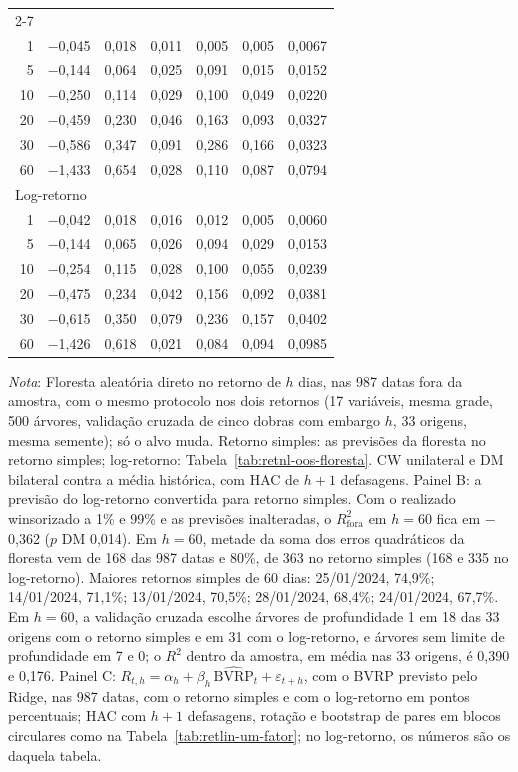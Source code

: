 \begin{table}[H]
\begin{tabular}{rrrrrrr}
\cmidrule(lr){2-7}
\multicolumn{7}{l}{Retorno simples} \\
1 & $-$0{,}045 & 0{,}018 & 0{,}011 & 0{,}005 & 0{,}005 & 0{,}0067 \\
5 & $-$0{,}144 & 0{,}064 & 0{,}025 & 0{,}091 & 0{,}015 & 0{,}0152 \\
10 & $-$0{,}250 & 0{,}114 & 0{,}029 & 0{,}100 & 0{,}049 & 0{,}0220 \\
20 & $-$0{,}459 & 0{,}230 & 0{,}046 & 0{,}163 & 0{,}093 & 0{,}0327 \\
30 & $-$0{,}586 & 0{,}347 & 0{,}091 & 0{,}286 & 0{,}166 & 0{,}0323 \\
60 & $-$1{,}433 & 0{,}654 & 0{,}028 & 0{,}110 & 0{,}087 & 0{,}0794 \\
\multicolumn{7}{l}{Log-retorno} \\
1 & $-$0{,}042 & 0{,}018 & 0{,}016 & 0{,}012 & 0{,}005 & 0{,}0060 \\
5 & $-$0{,}144 & 0{,}065 & 0{,}026 & 0{,}094 & 0{,}029 & 0{,}0153 \\
10 & $-$0{,}254 & 0{,}115 & 0{,}028 & 0{,}100 & 0{,}055 & 0{,}0239 \\
20 & $-$0{,}475 & 0{,}234 & 0{,}042 & 0{,}156 & 0{,}092 & 0{,}0381 \\
30 & $-$0{,}615 & 0{,}350 & 0{,}079 & 0{,}236 & 0{,}157 & 0{,}0402 \\
60 & $-$1{,}426 & 0{,}618 & 0{,}021 & 0{,}084 & 0{,}094 & 0{,}0985 \\
\bottomrule
\end{tabular}
\par\smallskip
\parbox{0.95\linewidth}{\footnotesize\textit{Nota}: Floresta aleatória direto no retorno de $h$ dias, nas 987 datas fora da amostra, com o mesmo protocolo nos dois retornos (17 variáveis, mesma grade, 500 árvores, validação cruzada de cinco dobras com embargo $h$, 33 origens, mesma semente); só o alvo muda. Retorno simples: as previsões da floresta no retorno simples; log-retorno: Tabela~\ref{tab:retnl-oos-floresta}. CW unilateral e DM bilateral contra a média histórica, com HAC de $h+1$ defasagens. Painel B: a previsão do log-retorno convertida para retorno simples. Com o realizado winsorizado a 1\% e 99\% e as previsões inalteradas, o $R^2_{\text{fora}}$ em $h = 60$ fica em $-$0{,}362 ($p$ DM 0{,}014). Em $h = 60$, metade da soma dos erros quadráticos da floresta vem de 168 das 987 datas e 80\%, de 363 no retorno simples (168 e 335 no log-retorno). Maiores retornos simples de 60 dias: 25/01/2024, 74{,}9\%; 14/01/2024, 71{,}1\%; 13/01/2024, 70{,}5\%; 28/01/2024, 68{,}4\%; 24/01/2024, 67{,}7\%. Em $h = 60$, a validação cruzada escolhe árvores de profundidade 1 em 18 das 33 origens com o retorno simples e em 31 com o log-retorno, e árvores sem limite de profundidade em 7 e 0; o $R^2$ dentro da amostra, em média nas 33 origens, é 0{,}390 e 0{,}176. Painel C: $R_{t,h} = \alpha_h + \beta_h\,\widehat{\text{BVRP}}_t + \varepsilon_{t+h}$, com o BVRP previsto pelo Ridge, nas 987 datas, com o retorno simples e com o log-retorno em pontos percentuais; HAC com $h+1$ defasagens, rotação e bootstrap de pares em blocos circulares como na Tabela~\ref{tab:retlin-um-fator}; no log-retorno, os números são os daquela tabela.}
\end{table}

